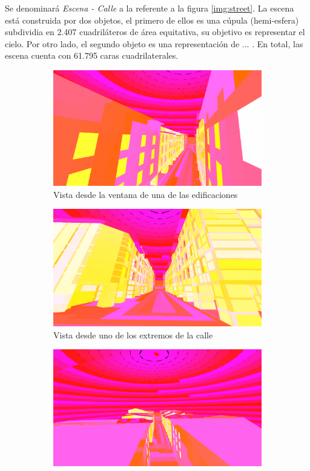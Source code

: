 Se denominará \textit{Escena - Calle} a la referente a la figura \ref{img:street}. La escena está construida por dos objetos, el primero de ellos es una cúpula (hemi-esfera) subdividia en 2.407 cuadriláteros de área equitativa, su objetivo es representar el cielo. Por otro lado, el segundo objeto es una representación de ... . En total, las escena cuenta con 61.795 caras cuadrilaterales.

\begin{figure}[H]
	\centering
	\begin{subfigure}{0.45\textwidth}
		\includegraphics[width=1\linewidth]{assets/street1}
		\caption{Vista desde la ventana de una de las edificaciones}
	\end{subfigure}
	\begin{subfigure}{0.45\textwidth}
	\includegraphics[width=1\linewidth]{assets/street2}
	\caption{Vista desde uno de los extremos de la calle}
	\end{subfigure}
	\begin{subfigure}{0.45\textwidth}
	\includegraphics[width=1\linewidth]{assets/street3}

\end{subfigure}
\end{figure}
